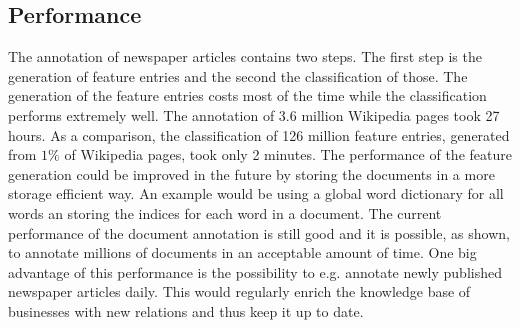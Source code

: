 \subsection*{Performance}
The annotation of newspaper articles contains two steps. The first step is the generation of feature entries and the second the classification of those. The generation of the feature entries costs most of the time while the classification performs extremely well. The annotation of 3.6 million Wikipedia pages took 27 hours. As a comparison, the classification of 126 million feature entries, generated from $1\%$ of Wikipedia pages, took only 2 minutes. The performance of the feature generation could be improved in the future by storing the documents in a more storage efficient way. An example would be using a global word dictionary for all words an storing the indices for each word in a document. The current performance of the document annotation is still good and it is possible, as shown, to annotate millions of documents in an acceptable amount of time. One big advantage of this performance is the possibility to e.g. annotate newly published newspaper articles daily. This would regularly enrich the knowledge base of businesses with new relations and thus keep it up to date.\par

